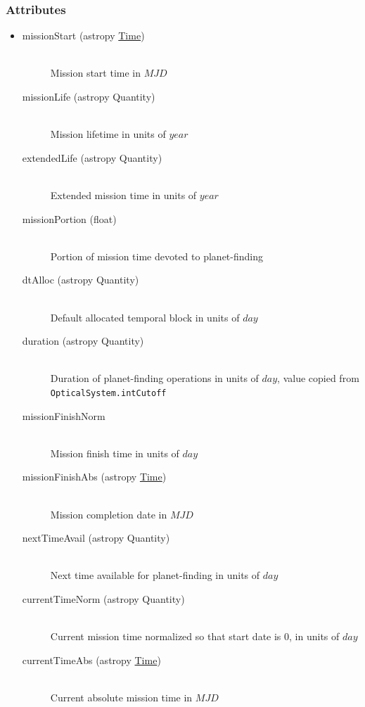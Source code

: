 \documentclass[cleanfoot]{asme2ej}
\begin{document}
\subsubsection*{Attributes}
\begin{itemize}
\item
\begin{description}
    \item[missionStart (astropy \href{http://astropy.readthedocs.org/en/latest/time/index.html}{Time})] \hfill \\
        Mission start time in $ MJD $
    \item[missionLife (astropy Quantity)] \hfill \\ Mission lifetime in units of $ year $
    \item[extendedLife (astropy Quantity)] \hfill \\ Extended mission time in units of $ year $
    \item[missionPortion (float)] \hfill \\ Portion of mission time devoted to planet-finding
    \item[dtAlloc (astropy Quantity)] \hfill \\ Default allocated temporal block in units of $ day $
    \item[duration (astropy Quantity)] \hfill \\ Duration of planet-finding operations in units of $ day $, value copied from \verb+OpticalSystem.intCutoff+
    \item[missionFinishNorm] \hfill \\ Mission finish time in units of $ day $
    \item[missionFinishAbs (astropy \href{http://astropy.readthedocs.org/en/latest/time/index.html}{Time})] \hfill \\ Mission completion date in $ MJD $
    \item[nextTimeAvail (astropy Quantity)] \hfill \\ Next time available for planet-finding in units of $ day $
    \item[currentTimeNorm (astropy Quantity)] \hfill \\ Current mission time normalized so that start date is 0, in units of $ day $
    \item[currentTimeAbs (astropy \href{http://astropy.readthedocs.org/en/latest/time/index.html}{Time})] \hfill \\ Current absolute mission time in $ MJD $
\end{description}
\end{itemize}
\end{document}

